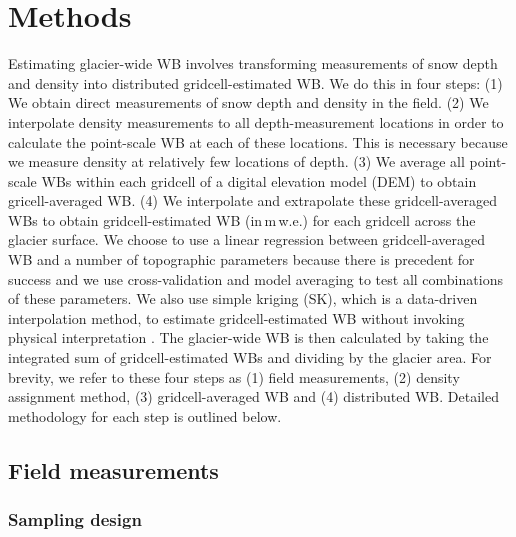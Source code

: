 \documentclass[twocolumn, letterpaper]{igs}
\begin{document}


\section{Methods}

Estimating glacier-wide WB involves transforming measurements of snow depth and density into distributed gridcell-estimated WB. We do this in four steps: (1) We obtain direct measurements of snow depth and density in the field. (2) We interpolate density measurements to all depth-measurement locations in order to calculate the point-scale WB at each of these locations. This is necessary because we measure density at relatively few locations of depth. (3) We average all point-scale WBs within each gridcell of a digital elevation model (DEM) to obtain gricell-averaged WB. (4) We interpolate and extrapolate these gridcell-averaged WBs to obtain gridcell-estimated WB (in\,m\,w.e.) for each gridcell across the glacier surface. We choose to use a linear regression between gridcell-averaged WB and a number of topographic parameters because there is precedent for success \citep[e.g.][]{McGrath2015} and we use cross-validation and model averaging to test all combinations of these parameters. We also use simple kriging (SK), which is a data-driven interpolation method, to estimate gridcell-estimated WB without invoking physical interpretation \citep[e.g.][]{Hock1999}. The glacier-wide WB is then calculated by taking the integrated sum of gridcell-estimated WBs and dividing by the glacier area. For brevity, we refer to these four steps as (1) field measurements, (2) density assignment method, (3) gridcell-averaged WB and (4) distributed WB. Detailed methodology for each step is outlined below.

\subsection{Field measurements}

\subsubsection{Sampling design}
\end{document}
